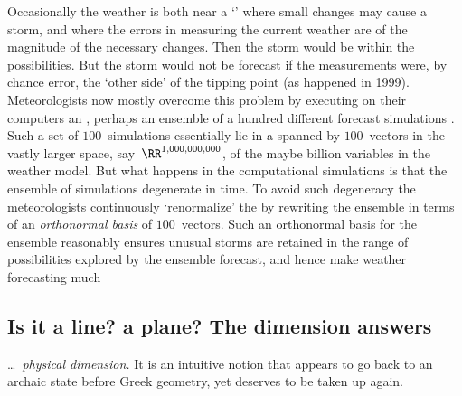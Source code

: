 Occasionally the weather is both near a `' where small changes may cause a storm, and where the errors in measuring the current weather are of the magnitude of the necessary changes.
Then the storm would be within the possibilities. 
But the storm would not be forecast if the measurements were, by chance error, the `other side' of the tipping point (as happened in 1999).
Meteorologists now mostly overcome this problem by executing on their computers an , perhaps an ensemble of a hundred different forecast simulations \cite[pp.274--80, e.g.]{Roulstone2013}.
Such a set of \(100\)~simulations essentially lie in a  spanned by \(100\)~vectors in the vastly larger space, say~\(\RR^{1,000,000,000}\), of the maybe billion variables in the weather model.
But what happens in the computational simulations is that the ensemble of simulations degenerate in time.
To avoid such degeneracy the meteorologists continuously `renormalize' the  by rewriting the ensemble in terms of an \emph{orthonormal basis} of \(100\)~vectors.
Such an orthonormal basis for the ensemble reasonably ensures unusual storms are retained in the range of possibilities explored by the ensemble forecast, and hence make weather forecasting much 





\subsection{Is it a line? a plane? The dimension answers}


\begin{quoted}{\cite{Mandelbrot1982}}
\ldots\ \emph{physical dimension.} It is an intuitive notion that appears to go back to an archaic state before Greek geometry, yet deserves to be taken up again.
\end{quoted}

